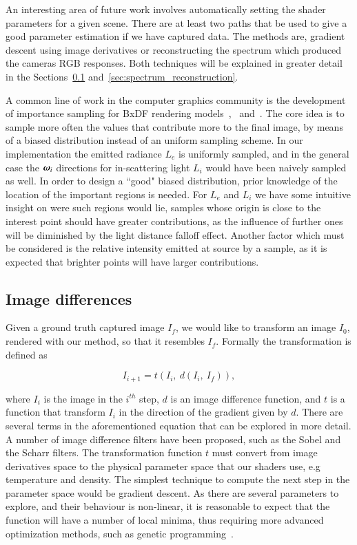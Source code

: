 An interesting area of future work involves automatically setting the shader parameters for a given scene.
There are at least two paths that be used to give a good parameter estimation if we have captured data.
The methods are, gradient descent using image derivatives or reconstructing the spectrum which produced the cameras RGB responses.
Both techniques will be explained in greater detail in the Sections~\ref{sec:image_differences} and~\ref{sec:spectrum_reconstruction}.

A common line of work in the computer graphics community is the development of importance sampling for BxDF rendering models~\cite{Lawrence:2004},~\cite{Ou:2012} and~\cite{Wang:2014}.
The core idea is to sample more often the values that contribute more to the final image, by means of a biased distribution instead of an uniform sampling scheme.
In our implementation the emitted radiance $L_e$ is uniformly sampled, and in the general case the $\boldsymbol{\omega}_i$ directions for in-scattering light $L_i$ would have been naively sampled as well.
In order to design a ``good" biased distribution, prior knowledge of the location of the important regions is needed. 
For $L_e$ and $L_i$ we have some intuitive insight on were such regions would lie, samples whose origin is close to the interest point should have greater contributions, as the influence of further ones will be diminished by the light distance falloff effect.
Another factor which must be considered is the relative intensity emitted at source by a sample, as it is expected that brighter points will have larger contributions. 

\subsection{Image differences}
\label{sec:image_differences}

Given a ground truth captured image $I_f$, we would like to transform an image $I_0$, rendered with our method, so that it resembles $I_f$.
Formally the transformation is defined as

\begin{equation}
I_{i+1} = t(I_i,~d(I_i,~I_f)),
\end{equation}

where $I_i$ is the image in the $i^{th}$ step, $d$ is an image difference function, and $t$ is a function that transform $I_i$ in the direction of the gradient given by $d$.
There are several terms in the aforementioned equation that can be explored in more detail.
A number of image difference filters have been proposed, such as the Sobel and the Scharr filters.
The transformation function $t$ must convert from image derivatives space to the physical parameter space that our shaders use, e.g temperature and density.
The simplest technique to compute the next step in the parameter space would be gradient descent.
As there are several parameters to explore, and their behaviour is non-linear, it is reasonable to expect that the function will have a number of local minima, thus requiring more advanced optimization methods, such as genetic programming~\cite{Dobashi:2012}.

